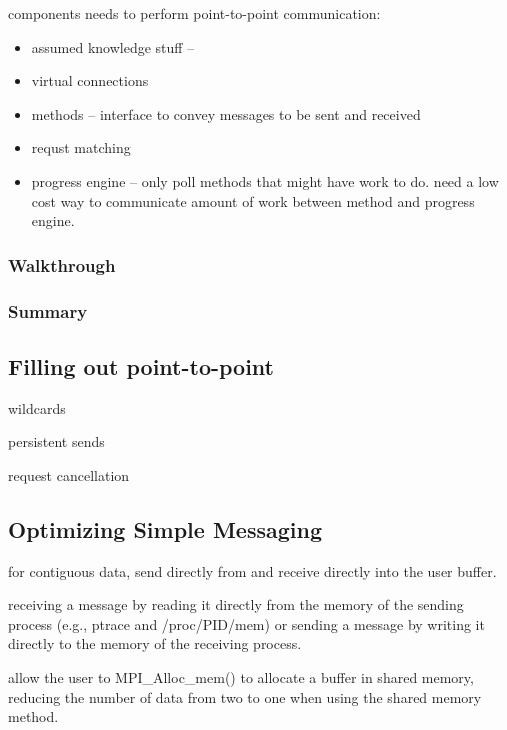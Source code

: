 components needs to perform point-to-point communication:
\begin{itemize}
\item assumed knowledge stuff -- 
\item virtual connections
\item methods --
interface to convey messages to be sent and received
\item requst matching
\item progress engine --
only poll methods that might have work to do.  need a low cost way to
communicate amount of work between method and progress engine.
\end{itemize}


\subsubsection{Walkthrough}


\subsubsection{Summary}



\subsection{Filling out point-to-point}

wildcards

persistent sends

request cancellation




\subsection{Optimizing Simple Messaging}


for contiguous data, send directly from and receive directly into the
user buffer.

receiving a message by reading it directly from the memory of the
sending process (e.g., ptrace and /proc/PID/mem) or sending a message
by writing it directly to the memory of the receiving process.

allow the user to MPI_Alloc_mem() to allocate a buffer in shared
memory, reducing the number of data from two to one when using the
shared memory method.


